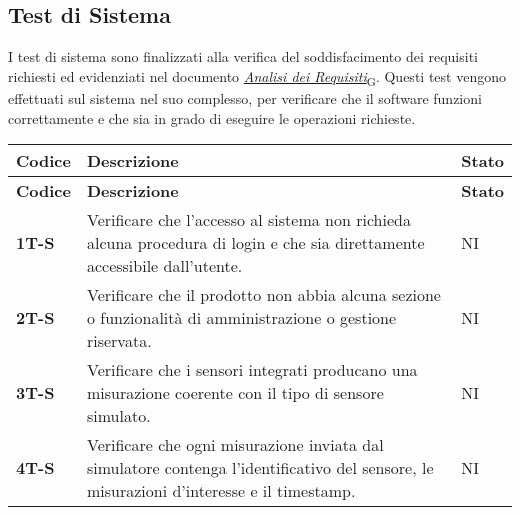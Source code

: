 \subsection{Test di Sistema}
I test di sistema sono finalizzati alla verifica del soddisfacimento dei requisiti richiesti ed evidenziati nel documento \href{https://7last.github.io/docs/rtb/documentazione-esterna/analisi-dei-requisiti}{\href{https://7last.github.io/docs/rtb/documentazione-interna/glossario\#analisi-dei-requisiti}{\textit{Analisi dei Requisiti}\textsubscript{G}}}. Questi test vengono effettuati sul sistema nel suo complesso, per verificare che il software funzioni correttamente e che sia in grado di eseguire le operazioni richieste. \\
\begin{longtable}{|>{\raggedright\arraybackslash}m{}|>{\raggedright\arraybackslash}m{}|>{\raggedright\arraybackslash}m{}|}
	\hline
	\textbf{Codice} & \textbf{Descrizione}                                                                                                                                                                             & \textbf{Stato} \\
	\hline
	\endfirsthead
	\hline
	\textbf{Codice} & \textbf{Descrizione}                                                                                                                                                                             & \textbf{Stato} \\
	\endhead
	\textbf{1T-S}   & Verificare che l'accesso al sistema non richieda alcuna procedura di login e che sia direttamente accessibile dall'utente.                                                                       & NI             \\
	\hline
	\textbf{2T-S}   & Verificare che il prodotto non abbia alcuna sezione o funzionalità di amministrazione o gestione riservata.                                                                                      & NI             \\
	\hline
	\textbf{3T-S}   & Verificare che i sensori integrati producano una misurazione coerente con il tipo di sensore simulato.                                                                                           & NI             \\
	\hline
	\textbf{4T-S}   & Verificare che ogni misurazione inviata dal simulatore contenga l’identificativo del sensore, le misurazioni d'interesse e il timestamp.                                                         & NI             \\

\end{longtable}
